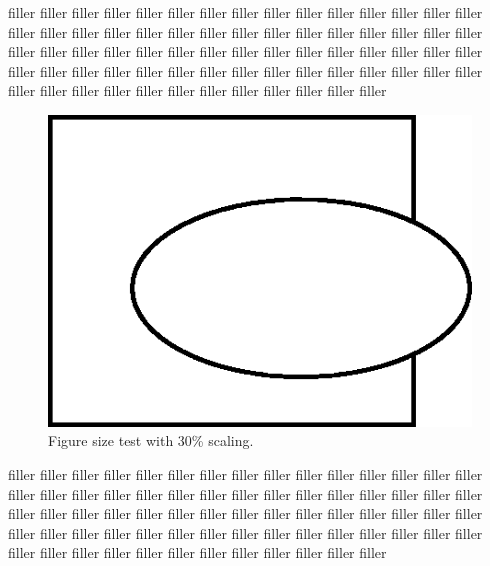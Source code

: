 \documentclass{article}
\begin{document}
filler filler filler filler filler filler filler filler filler filler filler filler
filler filler filler filler filler filler filler filler filler filler filler filler
filler filler filler filler filler filler filler filler filler filler filler filler
filler filler filler filler filler filler filler filler filler filler filler filler
filler filler filler filler filler filler filler filler filler filler filler filler
filler filler filler filler filler filler filler filler filler filler filler filler

\begin{figure}
\begin{center}
\includegraphics[scale=0.3]{fig_oval.png}
\caption{Figure size test with 30\% scaling.} 
\end{center}
\end{figure}

filler filler filler filler filler filler filler filler filler filler filler filler
filler filler filler filler filler filler filler filler filler filler filler filler
filler filler filler filler filler filler filler filler filler filler filler filler
filler filler filler filler filler filler filler filler filler filler filler filler
filler filler filler filler filler filler filler filler filler filler filler filler
filler filler filler filler filler filler filler filler filler filler filler filler
\end{document}
